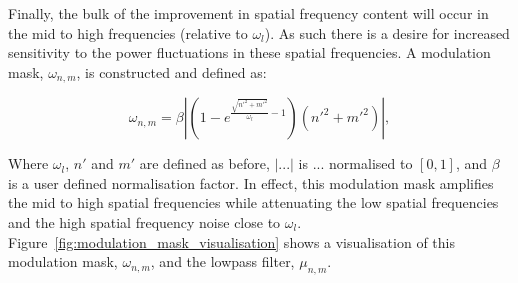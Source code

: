 Finally, the bulk of the improvement in spatial frequency content will
occur in the mid to high frequencies (relative to $\omega_{l}$). As such there is 
a desire for increased sensitivity to the power fluctuations in these 
spatial frequencies. A modulation mask, $\omega_{n,m}$, is constructed and 
defined as:

\begin{equation}\label{eq:attenuation_mask_norm_and_scaled}
\omega_{n,m} = \beta \left| \left(1 - e^{\frac{\sqrt{n'^{2} + m'^{2}}}{\omega_{l}}-1}\right) \left(n'^{2} + m'^{2}\right) \right|,
\end{equation}

Where $\omega_{l}$, $n'$ and $m'$ are defined as before, $\left|...\right|$ 
is $...$ normalised to $[0,1]$, and $\beta$ is a user defined 
normalisation factor. In effect, this modulation mask amplifies the mid 
to high spatial frequencies while attenuating the low spatial frequencies 
and the high spatial frequency noise close to $\omega_{l}$. Figure~\ref{fig:modulation_mask_visualisation} shows a visualisation of this modulation mask, $\omega_{n,m}$, and the lowpass filter, $\mu_{n,m}$.

